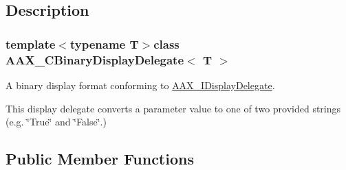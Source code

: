 \subsection{Description}
\subsubsection*{template$<$typename T$>$class A\+A\+X\+\_\+\+C\+Binary\+Display\+Delegate$<$ T $>$}

A binary display format conforming to \hyperlink{a00092}{A\+A\+X\+\_\+\+I\+Display\+Delegate}. 

This display delegate converts a parameter value to one of two provided strings (e.\+g. \char`\"{}\+True\char`\"{} and \char`\"{}\+False\char`\"{}.) \subsection*{Public Member Functions}
